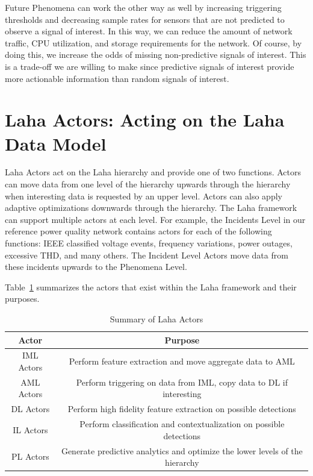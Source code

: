 Future Phenomena can work the other way as well by increasing triggering thresholds and decreasing sample rates for sensors that are not predicted to observe a signal of interest. In this way, we can reduce the amount of network traffic, CPU utilization, and storage requirements for the network. Of course, by doing this, we increase the odds of missing non-predictive signals of interest. This is a trade-off we are willing to make since predictive signals of interest provide more actionable information than random signals of interest.


\section{Laha Actors: Acting on the Laha Data Model}\label{sec:laha-actors:-acting-on-the-laha-data-model}
Laha Actors act on the Laha hierarchy and provide one of two functions. Actors can move data from one level of the hierarchy upwards through the hierarchy when interesting data is requested by an upper level. Actors can also apply adaptive optimizations downwards through the hierarchy. The Laha framework can support multiple actors at each level. For example, the Incidents Level in our reference power quality network contains actors for each of the following functions: IEEE classified voltage events, frequency variations, power outages, excessive THD, and many others. The Incident Level Actors move data from these incidents upwards to the Phenomena Level.

Table~\ref{laha-actors-tables} summarizes the actors that exist within the Laha framework and their purposes.

\begin{table}
	\centering
	\caption{Summary of Laha Actors}
	\begin{tabular}{|c|c|}
		\hline
		Actor & Purpose \\
		\hline
		IML Actors & Perform feature extraction and move aggregate data to AML \\
		\hline
		AML Actors & Perform triggering on data from IML, copy data to DL if interesting \\
		\hline
		DL Actors & Perform high fidelity feature extraction on possible detections \\
		\hline
		IL Actors & Perform classification and contextualization on possible detections \\
		\hline
		PL Actors & Generate predictive analytics and optimize the lower levels of the hierarchy \\
		\hline
	\end{tabular}
	\label{laha-actors-tables}
\end{table}

